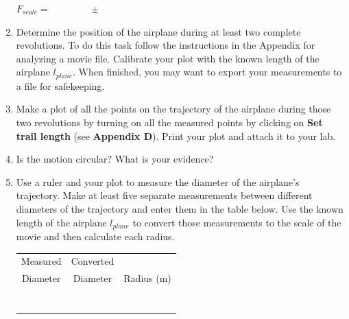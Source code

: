 \begin{enumerate}
\hspace{0.5in} $F_{scale} = \qquad\qquad \pm$

\vspace{5mm}

\item Determine the position of the airplane during at least two complete revolutions. To
do this task follow the instructions in the Appendix
for analyzing a movie file.
Calibrate your plot with the known length of the airplane $l_{plane}$.
When finished, you may want to export your measurements to a file for safekeeping.

\item Make a plot of all the points on the trajectory of the airplane during those two  revolutions  
by turning on all the measured points by clicking on {\bf Set trail length} (see {\bf Appendix D}).
Print your plot and attach it to your lab.

\item Is the motion circular? What is your evidence?
\vspace{10mm}

\item Use a ruler and your plot to measure the diameter of the airplane's trajectory.
Make at least five separate measurements between different diameters of the trajectory
and enter them in the table below.
Use the known length of the airplane $l_{plane}$ to convert those measurements to the scale of
the movie and then calculate each radius.

\begin{table}[h!]
\begin{center}
\begin{tabular}{|c|c|c|} \hline
Measured  &  Converted  &            \\
Diameter  &  Diameter   & Radius (m) \\ \hline
          &             &            \\
          &             &            \\
          &             &            \\
          &             &            \\
          &             &            \\
          &             &            \\
          &             &            \\ \hline
\end{tabular}
\end{center}
\end{table}


\end{enumerate}
